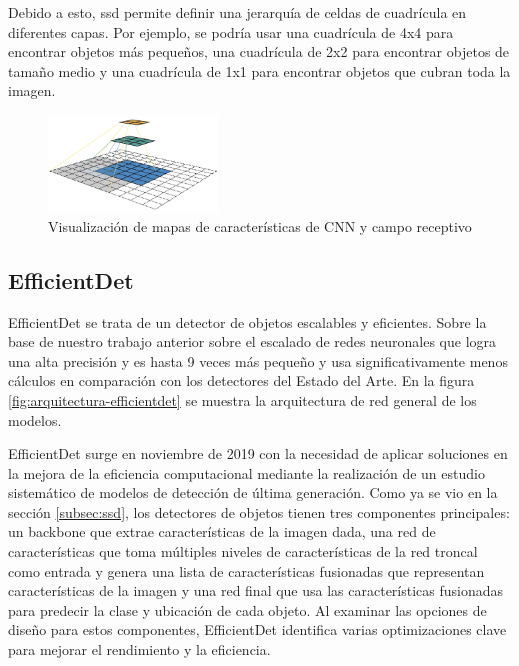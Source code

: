 Debido a esto, \gls{ssd} permite definir una jerarquía de celdas de cuadrícula en diferentes capas. Por ejemplo, se podría usar una cuadrícula de 4x4 para encontrar objetos más pequeños, una cuadrícula de 2x2 para encontrar objetos de tamaño medio y una cuadrícula de 1x1 para encontrar objetos que cubran toda la imagen.

\begin{figure}[ht]
\centering
\includegraphics[width=0.4\textwidth]{img/chapters/estado-del-arte/receptive-field.png}
\caption{\label{fig:receptive-field-ssd}Visualización de mapas de características de CNN y campo receptivo}
\end{figure}

\subsection{EfficientDet}
\label{subsec:efficientdet}

EfficientDet \cite{tan2020efficientdet} se trata de un detector de objetos escalables y eficientes. Sobre la base de nuestro trabajo anterior sobre el escalado de redes neuronales que logra una alta precisión y es hasta 9 veces más pequeño y usa significativamente menos cálculos en comparación con los detectores del Estado del Arte. En la figura \ref{fig:arquitectura-efficientdet} se muestra la arquitectura de red general de los modelos.

EfficientDet surge en noviembre de 2019 con la necesidad de aplicar soluciones en la mejora de la eficiencia computacional mediante la realización de un estudio sistemático de modelos de detección de última generación. Como ya se vio en la sección \ref{subsec:ssd}, los detectores de objetos tienen tres componentes principales: un backbone que extrae características de la imagen dada, una red de características que toma múltiples niveles de características de la red troncal como entrada y genera una lista de características fusionadas que representan características de la imagen y una red final que usa las características fusionadas para predecir la clase y ubicación de cada objeto. Al examinar las opciones de diseño para estos componentes, EfficientDet identifica varias optimizaciones clave para mejorar el rendimiento y la eficiencia.

